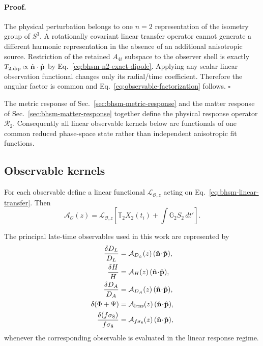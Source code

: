 \paragraph{Proof.}
The physical perturbation belongs to one $n=2$ representation of the
isometry group of $S^3$.  A rotationally covariant linear transfer operator
cannot generate a different harmonic representation in the absence of an
additional anisotropic source.  Restriction of the retained $A_{4i}$
subspace to the observer shell is exactly
$T_{2,\rm dip}\propto\hat{\mathbf n}\cdot\hat{\mathbf p}$ by
Eq.~\eqref{eq:bhsm-n2-exact-dipole}.  Applying any scalar linear observation
functional changes only its radial/time coefficient.  Therefore the angular
factor is common and Eq.~\eqref{eq:observable-factorization} follows.
\hfill$\square$

The metric response of Sec.~\ref{sec:bhsm-metric-response} and the matter
response of Sec.~\ref{sec:bhsm-matter-response} together define the physical
response operator $\mathcal R_2$.  Consequently all linear observable kernels
below are functionals of one common reduced phase-space state rather than
independent anisotropic fit functions.
\subsection{Observable kernels}

For each observable define a linear functional
$\mathcal L_{\mathcal O,z}$ acting on Eq.~\eqref{eq:bhsm-linear-transfer}.
Then
\begin{equation}
\mathcal A_{\mathcal O}(z)
=
\mathcal L_{\mathcal O,z}
\left[
\mathbb T_2X_2(t_i)
+
\int\mathbb G_2S_2\,dt'
\right].
\label{eq:observable-amplitude-functional}
\end{equation}

The principal late-time observables used in this work are represented by
\begin{align}
\frac{\delta D_L}{D_L}
&=
\mathcal A_{D_L}(z)\,
(\hat{\mathbf n}\!\cdot\!\hat{\mathbf p}),
\\
\frac{\delta H}{H}
&=
\mathcal A_H(z)\,
(\hat{\mathbf n}\!\cdot\!\hat{\mathbf p}),
\\
\frac{\delta D_A}{D_A}
&=
\mathcal A_{D_A}(z)\,
(\hat{\mathbf n}\!\cdot\!\hat{\mathbf p}),
\\
\delta(\Phi+\Psi)
&=
\mathcal A_{\rm lens}(z)\,
(\hat{\mathbf n}\!\cdot\!\hat{\mathbf p}),
\\
\frac{\delta(f\sigma_8)}{f\sigma_8}
&=
\mathcal A_{f\sigma_8}(z)\,
(\hat{\mathbf n}\!\cdot\!\hat{\mathbf p}),
\end{align}
whenever the corresponding observable is evaluated in the linear response
regime.

